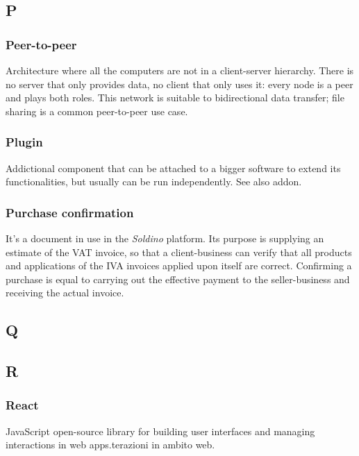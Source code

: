 \subsection*{P}

\subsubsection*{Peer-to-peer}
Architecture where all the computers are not in a client-server hierarchy. There is no server that only provides data, no client that only uses it: every node is a peer and plays both roles. This network is suitable to bidirectional data transfer; file sharing is a common peer-to-peer use case.

\subsubsection*{Plugin}
Addictional component that can be attached to a bigger software to extend its functionalities, but usually can be run independently. See also addon\glo.

\subsubsection*{Purchase confirmation}
It's a document in use in the \textit{Soldino} platform.
Its purpose is supplying an estimate of the VAT invoice, so that a client-business can verify that all products and applications of the IVA invoices applied upon itself are correct. Confirming a purchase is equal to carrying out the effective payment to the seller-business and receiving the actual invoice.


\subsection*{Q}


\subsection*{R}

\subsubsection*{React}
JavaScript open-source library for building user interfaces and managing interactions in web apps.terazioni in ambito web.

